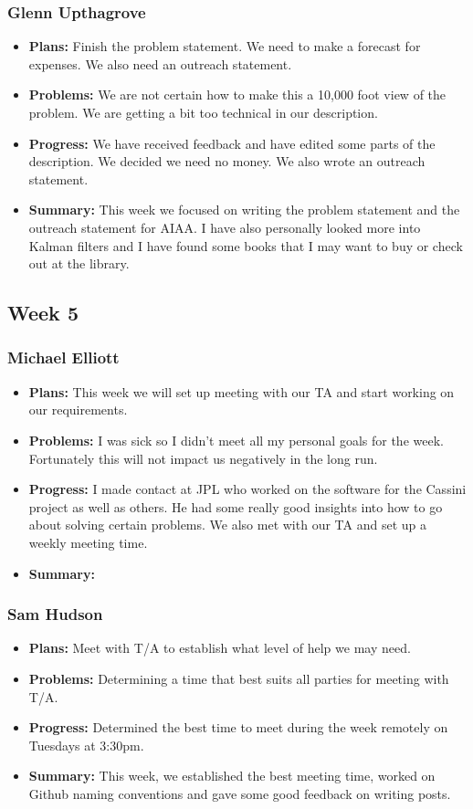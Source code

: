 \documentclass[onecolumn, draftclsnofoot,10pt, compsoc]{IEEEtran}
\begin{document}
\subsubsection{Glenn Upthagrove}
\begin {itemize}
 \item \textbf{Plans: }Finish the problem statement. We need to make a forecast for expenses. We also need an outreach statement. 
 \item \textbf{Problems: }We are not certain how to make this a 10,000 foot view of the problem. We are getting a bit too technical in our description. 
 \item \textbf{Progress: }We have received feedback and have edited some parts of the description. We decided we need no money. We also wrote an outreach statement. 
 \item \textbf{Summary: }This week we focused on writing the problem statement and the outreach statement for AIAA. I have also personally looked more into Kalman filters and I have found some books that I may want to buy or check out at the library.  
\end {itemize}
\subsection {Week 5}
\subsubsection{Michael Elliott}
\begin {itemize}
\item \textbf{Plans: }
  This week we will set up meeting with our TA and start working on our requirements.
\item \textbf{Problems: }
  I was sick so I didn't meet all my personal goals for the week. Fortunately this will not impact us negatively in the long run.
\item \textbf{Progress: }
  I made contact at JPL who worked on the software for the Cassini project as well as others. He had some really good insights into how to go about solving certain problems. We also met with our TA and set up a weekly meeting time.
\item \textbf{Summary: }
\end {itemize}
\subsubsection{Sam Hudson}
\begin {itemize}
\item \textbf{Plans: }Meet with T/A to establish what level of help we may need.
\item \textbf{Problems: }Determining a time that best suits all parties for meeting with T/A.
\item \textbf{Progress: }Determined the best time to meet during the week remotely on Tuesdays at 3:30pm.
\item \textbf{Summary: }This week, we established the best meeting time, worked on Github naming conventions and gave some good feedback on writing posts.
\end {itemize}
\end{document}
